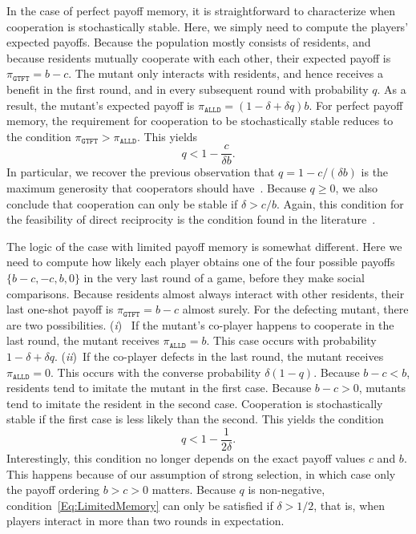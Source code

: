 \documentclass[11pt]{article}
\def\alld{\texttt{ALLD}}
\def\gtft{\texttt{GTFT}}
\theoremstyle{plainCl1}
\theoremstyle{plainCl2}
\begin{document}
In the case of perfect payoff memory, it is straightforward to characterize when cooperation is stochastically stable. 
Here, we simply need to compute the players' expected payoffs. 
Because the population mostly consists of residents, and because residents mutually cooperate with each other, their expected payoff is $\pi_\gtft = b\!-\!c$. 
The mutant only interacts with residents, and hence receives a benefit in the first round, and in every subsequent round with probability $q$. 
As a result, the mutant's expected payoff is $\pi_\alld \!=\! (1\!-\!\delta\!+\!\delta q)b$. 
For perfect payoff memory, the requirement for cooperation to be stochastically stable reduces to the condition $\pi_\gtft > \pi_\alld$. 
This yields
\begin{equation} \label{Eq:PerfectMemory}
q < 1\!-\!\frac{c}{\delta  b}.
\end{equation}
In particular, we recover the previous observation that $q\!=\!1-c/(\delta b)$ is the maximum generosity that cooperators should have~\citep{molander:jcr:1985,Nowak1992tit,Schmid:NHB:2021}. 
Because $q\!\ge\!0$, we also conclude that cooperation can only be stable if $\delta \!>\! c/b$.
Again, this condition for the feasibility of direct reciprocity is the condition found in the literature~\citep{nowak:Science:2006}.


The logic of the case with limited payoff memory is somewhat different. 
Here we need to compute how likely each player obtains one of the four possible payoffs $\{b\!-\!c, -c, b, 0\}$ in the very last round of a game, before they make social comparisons.
Because residents almost always interact with other residents, their last one-shot payoff is $\pi_\gtft = b\!-\!c$ almost surely. 
For the defecting mutant, there are two possibilities. 
({\it i})~ If the mutant's co-player happens to cooperate in the last round, the mutant receives $\pi_\alld\!=\!b$.
This case occurs with probability $1\!-\!\delta\!+\!\delta q$. 
({\it ii})~If the co-player defects in the last round, the mutant receives $\pi_\alld=\!0$. 
This occurs with the converse probability $\delta(1\!-\!q)$.
Because $b\!-\!c\!<\!b$, residents tend to imitate the mutant in the first case. 
Because $b\!-\!c\!>\!0$, mutants tend to imitate the resident in the second case. 
Cooperation is stochastically stable if the first case is less likely than the second. 
This yields the condition
\begin{equation} \label{Eq:LimitedMemory}
q < 1\!-\!\frac{1}{2 \delta}.
\end{equation}
Interestingly, this condition no longer depends on the exact payoff values $c$ and $b$. This happens because of our assumption of strong selection, in which case only the payoff ordering $b\!>\!c\!>\!0$ matters. Because $q$ is non-negative, condition~\eqref{Eq:LimitedMemory} can only be satisfied if $\delta\!>\!1/2$, that is, when players interact in more than two rounds in expectation. 
\end{document}
